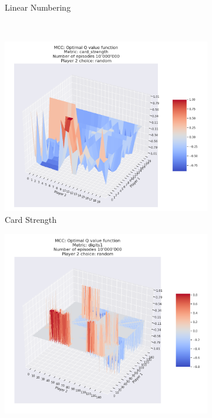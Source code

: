 \begin{figure}[ht!]
\begin{subfigure}{0.5\textwidth}
        \caption[Linear Numbering]{Linear Numbering}
        \label{fig:mcclinear numbering}
    \end{subfigure} \\
    \begin{subfigure}{0.5\textwidth}
        \includegraphics[width=1\linewidth]{Figures/mcc_card_strength_10000000_random}
        \caption[Card Strength]{Card Strength}
        \label{fig:mcccard strength}
    \end{subfigure}
    \begin{subfigure}{0.5\textwidth}
        \includegraphics[width=1\linewidth]{Figures/mcc_digits1_10000000_random} 

\end{subfigure}
\end{figure}
